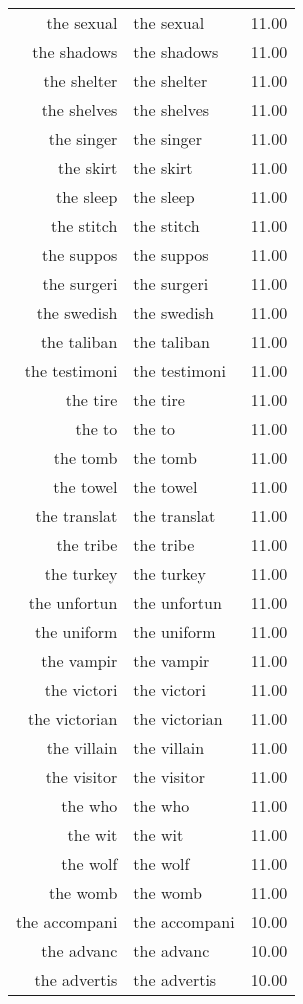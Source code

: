 \begin{table}[ht]
\begin{tabular}{rlr}
  the sexual & the sexual & 11.00 \\ 
  the shadows & the shadows & 11.00 \\ 
  the shelter & the shelter & 11.00 \\ 
  the shelves & the shelves & 11.00 \\ 
  the singer & the singer & 11.00 \\ 
  the skirt & the skirt & 11.00 \\ 
  the sleep & the sleep & 11.00 \\ 
  the stitch & the stitch & 11.00 \\ 
  the suppos & the suppos & 11.00 \\ 
  the surgeri & the surgeri & 11.00 \\ 
  the swedish & the swedish & 11.00 \\ 
  the taliban & the taliban & 11.00 \\ 
  the testimoni & the testimoni & 11.00 \\ 
  the tire & the tire & 11.00 \\ 
  the to & the to & 11.00 \\ 
  the tomb & the tomb & 11.00 \\ 
  the towel & the towel & 11.00 \\ 
  the translat & the translat & 11.00 \\ 
  the tribe & the tribe & 11.00 \\ 
  the turkey & the turkey & 11.00 \\ 
  the unfortun & the unfortun & 11.00 \\ 
  the uniform & the uniform & 11.00 \\ 
  the vampir & the vampir & 11.00 \\ 
  the victori & the victori & 11.00 \\ 
  the victorian & the victorian & 11.00 \\ 
  the villain & the villain & 11.00 \\ 
  the visitor & the visitor & 11.00 \\ 
  the who & the who & 11.00 \\ 
  the wit & the wit & 11.00 \\ 
  the wolf & the wolf & 11.00 \\ 
  the womb & the womb & 11.00 \\ 
  the accompani & the accompani & 10.00 \\ 
  the advanc & the advanc & 10.00 \\ 
  the advertis & the advertis & 10.00 \\ 

\end{tabular}
\end{table}
